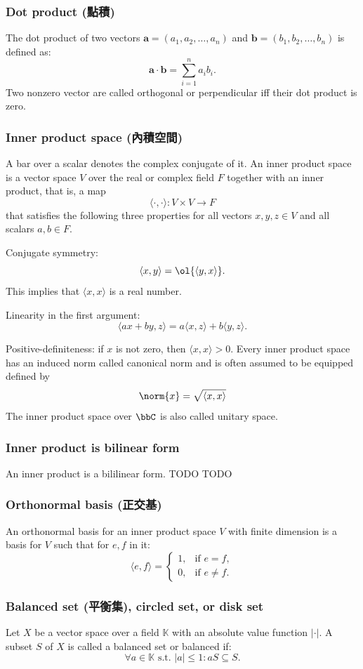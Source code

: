 \documentclass[a4paper,12pt]{report}
\begin{document}
\subsubsection{Dot product (點積)}
The dot product of two vectors $\mathbf{a}=(a_1,a_2,\dots,a_n)$ and $\mathbf{b}=(b_1,b_2,\dots,b_n)$ is defined as:
\[\mathbf{a}\cdot\mathbf{b}=\sum_{i=1}^n a_ib_i.\]
Two nonzero vector are called orthogonal or perpendicular iff their dot product is zero.
\subsubsection{Inner product space (內積空間)}
A bar over a scalar denotes the complex conjugate of it. An inner product space is a vector space $V$ over the real or complex field $F$ together with an inner product, that is, a map
\[\langle \cdot ,\cdot \rangle \colon V\times V\to F\]
that satisfies the following three properties for all vectors $x,y,z\in V$ and all scalars $a,b\in F$.
\bit
\item Conjugate symmetry: 
\[\langle x,y\rangle =\ol{\langle y,x\rangle }.\]
This implies that $\langle x,x\rangle$ is a real number.
\item Linearity in the first argument:
\[ \langle ax+by,z\rangle =a\langle x,z\rangle +b\langle y,z\rangle .\]
\item Positive-definiteness: if $x$ is not zero, then $\langle x,x\rangle >0$.
\eit
Every inner product space has an induced norm called canonical norm and is often assumed to be equipped defined by
\[\norm{x}=\sqrt{\langle x,x\rangle}\]
The inner product space over $\bbC$ is also called unitary space.
\subsubsection{Inner product is bilinear form}
An inner product is a bililinear form. TODO
\bpr
TODO
\epr
\subsubsection{Orthonormal basis (正交基)}
An orthonormal basis for an inner product space $V$ with finite dimension is a basis for $V$ such that for $e,f$ in it:
\[\langle e,f \rangle = \begin{cases}1, & \text{if } e=f,\\0, & \text{if } e\neq f.\end{cases}\]
\subsubsection{Balanced set (平衡集), circled set, or disk set}
Let $X$ be a vector space over a field $\mathbb{K}$ with an absolute value function $|\cdot |$. A subset $S$ of $X$ is called a balanced set or balanced if:
\[\forall a\in\mathbb{K}\text{ s.t. }|a|\leq 1\colon aS\subseteq S.\]
\end{document}
